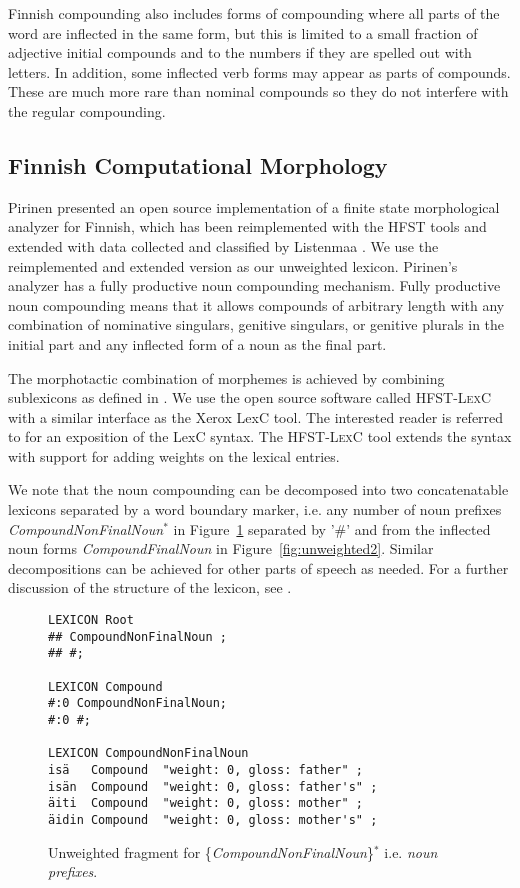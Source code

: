 \documentclass[postprint]{flammie}
\begin{document}
Finnish compounding also includes forms of compounding where all parts
of the word are inflected in the same form, but this is limited to a
small fraction of adjective initial compounds and to the numbers if
they are spelled out with letters. In addition, some inflected verb
forms may appear as parts of compounds. These are much more rare than
nominal compounds \cite{iskwww} so they do not interfere with the
regular compounding.

\subsection{Finnish Computational Morphology}
\label{Sect13}

Pirinen \cite{pirinen2008} presented an open source implementation of
a finite state morphological analyzer for Finnish, which has been
reimplemented with the \textsc{HFST} tools and extended with data
collected and classified by Listenmaa \cite{listenmaa2009}. We use the
reimplemented and extended version as our unweighted lexicon.
Pirinen's analyzer has a fully productive noun compounding
mechanism. Fully productive noun compounding means that it allows
compounds of arbitrary length with any combination of nominative
singulars, genitive singulars, or genitive plurals in the initial part
and any inflected form of a noun as the final part. 

The morphotactic combination of morphemes is achieved by combining
sublexicons as defined in \cite{beesley2004}. We use the open source
software called \textsc{HFST-LexC} with a similar interface as the
Xerox LexC tool. The interested reader is referred to
\cite{beesley2004} for an exposition of the LexC syntax. The
\textsc{HFST-LexC} tool extends the syntax with support for adding
weights on the lexical entries. 

We note that the noun compounding can be decomposed into two
concatenatable lexicons separated by a word boundary marker, i.e. any
number of noun prefixes \emph{CompoundNonFinalNoun}$^*$ in
Figure~\ref{fig:unweighted1} separated by '\#' and from the inflected
noun forms \emph{CompoundFinalNoun} in
Figure~\ref{fig:unweighted2}. Similar decompositions can be achieved
for other parts of speech as needed. For a further discussion of the
structure of the lexicon, see \cite{linden09nodalida}.

\begin{figure}[h!]
  \centering
  \begin{scriptsize}
\begin{verbatim}
LEXICON Root
## CompoundNonFinalNoun ;
## #;

LEXICON Compound
#:0 CompoundNonFinalNoun;
#:0 #;

LEXICON CompoundNonFinalNoun
isä   Compound  "weight: 0, gloss: father" ;
isän  Compound  "weight: 0, gloss: father's" ;
äiti  Compound  "weight: 0, gloss: mother" ;
äidin Compound  "weight: 0, gloss: mother's" ;
\end{verbatim}
  \end{scriptsize}
  \caption{Unweighted fragment for
    \{\emph{CompoundNonFinalNoun}\}$^*$ i.e. \emph{noun
      prefixes}.}\label{fig:unweighted1}
\end{figure}
\end{document}
